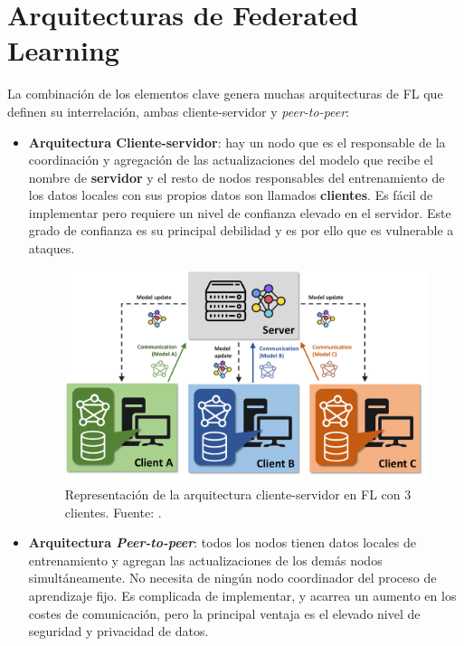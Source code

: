 \section{Arquitecturas de Federated Learning}
La combinación de los elementos clave genera muchas arquitecturas de \ac{FL} que definen su interrelación, ambas cliente-servidor y \textit{peer-to-peer}:
\begin{itemize}
    \item \textbf{Arquitectura Cliente-servidor}: hay un nodo que es el responsable de la coordinación y agregación de las actualizaciones del modelo que recibe el nombre de \textbf{servidor} y el resto de nodos responsables del entrenamiento de los datos locales con sus propios datos son llamados \textbf{clientes}. Es fácil de implementar pero requiere un nivel de confianza elevado en el servidor. Este grado de confianza es su principal debilidad y es por ello que es vulnerable a ataques.

    \begin{figure}[h!]
      \centering
      \includegraphics[width = \linewidth]{figuras/cliente-servidor.pdf}
      \caption{Representación de la arquitectura cliente-servidor en \ac{FL} con 3 clientes. Fuente: \cite{tutorial-nuria}.}
      \label{clientserver}
    \end{figure}

    \item \textbf{Arquitectura \textit{Peer-to-peer}}: todos los nodos tienen datos locales de entrenamiento y agregan las actualizaciones de los demás nodos simultáneamente. No necesita de ningún nodo coordinador del proceso de aprendizaje fijo. Es complicada de implementar, y acarrea un aumento en los costes de comunicación, pero la principal ventaja es el elevado nivel de seguridad y privacidad de datos.
\end{itemize}

